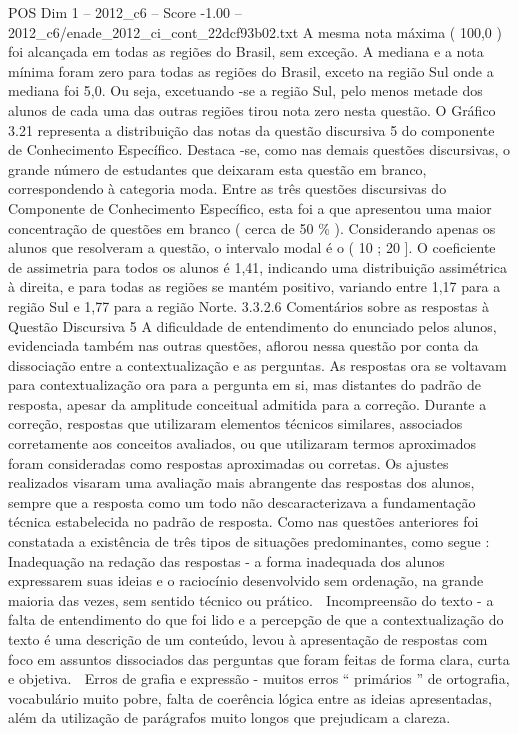 \begin{textsample}{POS Dim 1 – 2012\_c6 – Score -1.00 – 2012\_c6/enade\_2012\_ci\_cont\_22dcf93b02.txt}
A mesma nota máxima ( 100,0 ) foi alcançada em todas as regiões do Brasil, sem exceção.
A mediana e a nota mínima foram zero para todas as regiões do Brasil, exceto na região Sul onde a mediana foi 5,0.
Ou seja, excetuando -se a região Sul, pelo menos metade dos alunos de cada uma das outras regiões tirou nota zero nesta questão.
O Gráfico 3.21 representa a distribuição das notas da questão discursiva 5 do componente de Conhecimento Específico.
Destaca -se, como nas demais questões discursivas, o grande número de estudantes que deixaram esta questão em branco, correspondendo à categoria moda.
Entre as três questões discursivas do Componente de Conhecimento Específico, esta foi a que apresentou uma maior concentração de questões em branco ( cerca de 50 \% ).
Considerando apenas os alunos que resolveram a questão, o intervalo modal é o ( 10 ; 20 ].
O coeficiente de assimetria para todos os alunos é 1,41, indicando uma distribuição assimétrica à direita, e para todas as regiões se mantém positivo, variando entre 1,17 para a região Sul e 1,77 para a região Norte. 3.3.2.6 Comentários sobre as respostas à Questão Discursiva 5 A dificuldade de entendimento do enunciado pelos alunos, evidenciada também nas outras questões, aflorou nessa questão por conta da dissociação entre a contextualização e as perguntas.
As respostas ora se voltavam para contextualização ora para a pergunta em si, mas distantes do padrão de resposta, apesar da amplitude conceitual admitida para a correção.
Durante a correção, respostas que utilizaram elementos técnicos similares, associados corretamente aos conceitos avaliados, ou que utilizaram termos aproximados foram consideradas como respostas aproximadas ou corretas.
Os ajustes realizados visaram uma avaliação mais abrangente das respostas dos alunos, sempre que a resposta como um todo não descaracterizava a fundamentação técnica estabelecida no padrão de resposta.
Como nas questões anteriores foi constatada a existência de três tipos de situações predominantes, como segue :  Inadequação na redação das respostas - a forma inadequada dos alunos expressarem suas ideias e o raciocínio desenvolvido sem ordenação, na grande maioria das vezes, sem sentido técnico ou prático.  Incompreensão do texto - a falta de entendimento do que foi lido e a percepção de que a contextualização do texto é uma descrição de um conteúdo, levou à apresentação de respostas com foco em assuntos dissociados das perguntas que foram feitas de forma clara, curta e objetiva.  Erros de grafia e expressão - muitos erros “ primários ” de ortografia, vocabulário muito pobre, falta de coerência lógica entre as ideias apresentadas, além da utilização de parágrafos muito longos que prejudicam a clareza.

\end{textsample}
